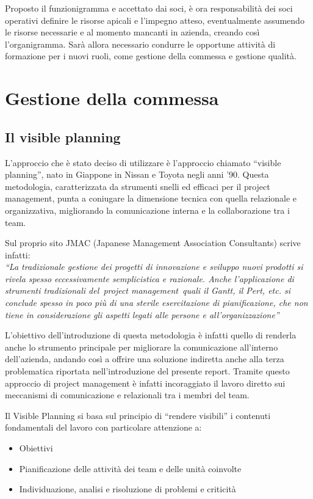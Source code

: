 \begin{multicols}{2}
	Proposto il funzionigramma e accettato dai soci, è ora responsabilità dei soci operativi definire le risorse apicali e l’impegno atteso, eventualmente assumendo le risorse necessarie e al momento mancanti in azienda, creando così l’organigramma. Sarà allora necessario condurre le opportune attività di formazione per i nuovi ruoli, come gestione della commessa e gestione qualità.

\section{Gestione della commessa}
\subsection{Il visible planning}
	L’approccio che è stato deciso di utilizzare è l’approccio chiamato “visible planning”, nato in Giappone in Nissan e Toyota negli anni '90. Questa metodologia, caratterizzata da strumenti snelli ed efficaci per il project management, punta a coniugare la dimensione tecnica con quella relazionale e organizzativa, migliorando la comunicazione interna e la collaborazione tra i team.

	Sul proprio sito JMAC (Japanese Management Association Consultants) scrive infatti:\\\textit{	“La tradizionale gestione dei progetti di innovazione e sviluppo nuovi prodotti si rivela spesso eccessivamente semplicistica e razionale. Anche l’applicazione di strumenti tradizionali del project management quali il Gantt, il Pert, etc. si conclude spesso in poco più di una sterile esercitazione di pianificazione, che non tiene in considerazione gli aspetti legati alle persone e all’organizzazione”}

	L’obiettivo dell’introduzione di questa metodologia è infatti quello di renderla anche lo strumento principale per migliorare la comunicazione all’interno dell’azienda, andando così a offrire una soluzione indiretta anche alla terza problematica riportata nell’introduzione del presente report. Tramite questo approccio di project management è infatti incoraggiato il lavoro diretto sui meccanismi di comunicazione e relazionali tra i membri del team.

	Il Visible Planning si basa sul principio di “rendere visibili” i contenuti fondamentali del lavoro con particolare attenzione a:

	\begin{itemize}
		\item Obiettivi
        \item Pianificazione delle attività dei team e delle unità coinvolte
		\item Individuazione, analisi e risoluzione di problemi e criticità
	\end{itemize}


\end{multicols}
